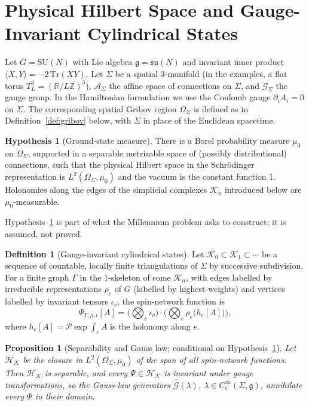 \documentclass[11pt,a4paper]{amsart}
\newtheorem{proposition}[theorem]{Proposition}
\theoremstyle{definition}
\newtheorem{definition}[theorem]{Definition}
\newtheorem{hypothesis}[theorem]{Hypothesis}
\newcommand{\R}{\mathbb{R}}
\newcommand{\Z}{\mathbb{Z}}
\newcommand{\cA}{\mathcal{A}}
\newcommand{\cG}{\mathcal{G}}
\newcommand{\cH}{\mathcal{H}}
\newcommand{\su}{\mathfrak{su}}
\newcommand{\Tr}{\mathrm{Tr}}
\begin{document}
\section{Physical Hilbert Space and Gauge-Invariant Cylindrical States}

Let $G = \mathrm{SU}(N)$ with Lie algebra $\mathfrak{g} = \su(N)$ and invariant inner product $\langle X, Y \rangle = -2\,\Tr(X Y)$. Let $\Sigma$ be a spatial $3$-manifold (in the examples, a flat torus $T^3_L = (\R/L\Z)^3$), $\cA_\Sigma$ the affine space of connections on $\Sigma$, and $\cG_\Sigma$ the gauge group. In the Hamiltonian formulation we use the Coulomb gauge $\partial_i A_i = 0$ on $\Sigma$. The corresponding spatial Gribov region $\Omega_\Sigma$ is defined as in Definition~\ref{def:gribov} below, with $\Sigma$ in place of the Euclidean spacetime.

\begin{hypothesis}[Ground-state measure]
\label{hyp:measure}
There is a Borel probability measure $\mu_0$ on $\Omega_\Sigma$, supported in a separable metrizable space of (possibly distributional) connections, such that the physical Hilbert space in the Schr\"odinger representation is $L^2(\Omega_\Sigma, \mu_0)$ and the vacuum is the constant function $1$. Holonomies along the edges of the simplicial complexes $\mathcal{K}_n$ introduced below are $\mu_0$-measurable.
\end{hypothesis}

Hypothesis~\ref{hyp:measure} is part of what the Millennium problem asks to construct; it is assumed, not proved.

\begin{definition}[Gauge-invariant cylindrical states]
Let $\mathcal{K}_0 \subset \mathcal{K}_1 \subset \cdots$ be a sequence of countable, locally finite triangulations of $\Sigma$ by successive subdivision. For a finite graph $\Gamma$ in the $1$-skeleton of some $\mathcal{K}_n$, with edges labelled by irreducible representations $\rho_e$ of $G$ (labelled by highest weights) and vertices labelled by invariant tensors $\iota_v$, the spin-network function is
\begin{equation}
    \Psi_{\Gamma,\rho,\iota}[A] = \Big( \bigotimes_{v} \iota_v \Big) \cdot \Big( \bigotimes_{e} \rho_e\big(h_e[A]\big) \Big),
\end{equation}
where $h_e[A] = \mathcal{P}\exp\int_e A$ is the holonomy along $e$.
\end{definition}

\begin{proposition}[Separability and Gauss law; conditional on Hypothesis~\ref{hyp:measure}]
\label{prop:hilbert}
Let $\cH_{\mathcal{K}}$ be the closure in $L^2(\Omega_\Sigma,\mu_0)$ of the span of all spin-network functions. Then $\cH_{\mathcal{K}}$ is separable, and every $\Psi \in \cH_{\mathcal{K}}$ is invariant under gauge transformations, so the Gauss-law generators $\hat{\mathcal{G}}(\lambda)$, $\lambda \in C_c^\infty(\Sigma, \mathfrak{g})$, annihilate every $\Psi$ in their domain.
\end{proposition}
\end{document}
